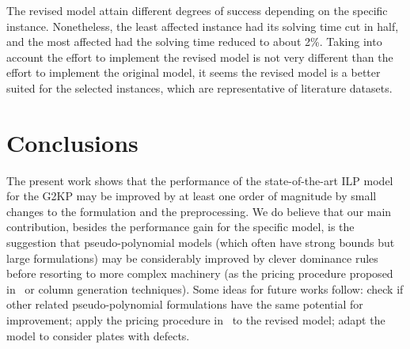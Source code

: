 \documentclass[runningheads]{llncs}
\begin{document}
The revised model attain different degrees of success depending on the specific instance.
Nonetheless, the least affected instance had its solving time cut in half, and the most affected had the solving time reduced to about 2\%.
Taking into account the effort to implement the revised model is not very different than the effort to implement the original model, it seems the revised model is a better suited for the selected instances, which are representative of literature datasets.


\section{Conclusions}

The present work shows that the performance of the state-of-the-art ILP model for the G2KP may be improved by at least one order of magnitude by small changes to the formulation and the preprocessing.
We do believe that our main contribution, besides the performance gain for the specific model, is the suggestion that pseudo-polynomial models (which often have strong bounds but large formulations) may be considerably improved by clever dominance rules before resorting to more complex machinery (as the pricing procedure proposed in~\cite{furini:2016} or column generation techniques).
Some ideas for future works follow: check if other related pseudo-polynomial formulations have the same potential for improvement; apply the pricing procedure in~\cite{furini:2016} to the revised model; adapt the model to consider plates with defects.

\end{document}
